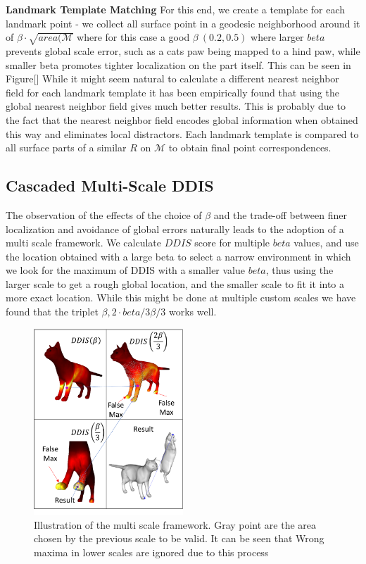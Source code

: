 \documentclass[10pt,twocolumn,letterpaper]{article}
\begin{document}
\textbf{Landmark Template Matching}
For this end, we create a template for each landmark point - we collect all surface point in a geodesic neighborhood around it of $\beta\cdot\sqrt{area(\mathcal{M}}$  where for this case a good $\beta~(0.2,0.5)$ where larger $beta$ prevents global scale error, such as a cats paw being mapped to a hind paw, while smaller beta promotes tighter localization on the part itself. This can be seen in Figure[] While it might seem natural to calculate a different nearest neighbor field for each landmark template it has been empirically found that using the global nearest neighbor field gives much better results. This is probably due to the fact that the nearest neighbor field encodes global information when obtained this way and eliminates local distractors.
Each landmark template is compared to all surface parts of a similar $R$ on $\mathcal{M}$ to obtain final point correspondences.


\subsection{Cascaded Multi-Scale DDIS}
The observation of the effects of the choice of $\beta$ and the trade-off between finer localization and avoidance of global errors naturally leads to the adoption of a multi scale framework. We calculate $DDIS$ score for multiple $beta$ values, and use the location obtained with a large beta to select a narrow environment in which we look for the maximum of DDIS with a smaller value $beta$, thus using the larger scale to get a rough global location, and the smaller scale to fit it into a more exact location. While this might be done at multiple custom scales we have found that the triplet $\beta ,2\cdot beta/3\beta/3$ works well.
\begin{figure}[htb]
	\includegraphics[width=0.5\textwidth]{figures/MultiScaleDis.png}
	\caption{Illustration of the multi scale framework. Gray point are the area chosen by the previous scale to be valid. It can be seen that Wrong maxima in lower scales are ignored due to this process}
\end{figure}
\end{document}
